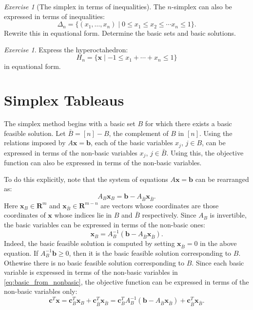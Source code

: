 \documentclass{amsbook}
\newcommand{\xx}{\mathbf x}
\newcommand{\cc}{\mathbf c}
\newcommand{\bb}{\mathbf b}
\newcommand{\RR}{\mathbf R}
\theoremstyle{definition}
\theoremstyle{remark}
\newtheorem{exercise}[theorem]{Exercise}
\begin{document}
\begin{exercise}
  [The simplex in terms of inequalities]
  The $n$-simplex can also be expressed in terms of inequalities:
  \begin{displaymath}
    \Delta_n = \{(x_1,\dotsc,x_n)\mid 0\leq x_1\leq x_2 \leq \dotsb x_n\leq 1\}.
  \end{displaymath}
  Rewrite this in equational form.
  Determine the basic sets and basic solutions.
\end{exercise}
\begin{exercise}
  Express the hyperoctahedron:
  \begin{displaymath}
    H_n = \{\xx\mid -1\leq x_1+\dotsb+x_n\leq 1\}
  \end{displaymath}
  in equational form.
\end{exercise}

\section{Simplex Tableaus}
\label{sec:simplex-method}

The simplex method begins with a basic set $B$ for which there exists a basic feasible solution.
Let $\bar B=[n]-B$, the complement of $B$ in $[n]$.
Using the relations imposed by $A\xx=\bb$, each of the basic variables $x_j$, $j\in B$, can be expressed in terms of the non-basic variables $x_j$, $j\in \bar B$.
Using this, the objective function can also be expressed in terms of the non-basic variables.

To do this explicitly, note that the system of equations $A\xx=\bb$ can be rearranged as:
\begin{equation}
  \label{eq:basic_from_nonbasic}
  A_B\xx_B = \bb-A_{\bar B}\xx_{\bar B}.
\end{equation}
Here $\xx_B\in\RR^m$ and $\xx_{\bar B}\in\RR^{m-n}$ are vectors whose coordinates are those coordinates of $\xx$ whose indices lie in $B$ and $\bar B$ respectively. 
Since $A_B$ is invertible, the basic variables can be expressed in terms of the non-basic ones:
\begin{displaymath}
  \xx_B = A_B^{-1}(\bb-A_{\bar B}\xx_{\bar B}).
\end{displaymath}
Indeed, the basic feasible solution is computed by setting $\xx_{\bar B}=0$ in the above equation.
If $A_B^{-1}\bb\geq 0$, then it is the basic feasible solution corresponding to $B$.
Othewise there is no basic feasible solution corresponding to $B$.
Since each basic variable is expressed in terms of the non-basic variables in \eqref{eq:basic_from_nonbasic}, the objective function can be expressed in terms of the non-basic variables only:
\begin{displaymath}
  \cc^T\xx = \cc_B^T\xx_B + \cc_{\bar B}^T\xx_{\bar B} = \cc^T_BA_B^{-1}(\bb-A_{\bar B}\xx_{\bar B}) + \cc^T_{\bar B}\xx_{\bar B}.
\end{displaymath}
\end{document}
